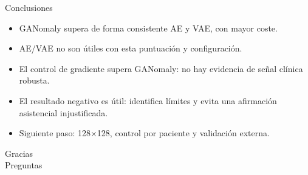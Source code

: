 \documentclass[aspectratio=169,10pt]{beamer}
\begin{document}
\begin{frame}{Conclusiones}
  \begin{itemize}
    \item GANomaly supera de forma consistente AE y VAE, con mayor coste.
    \item AE/VAE no son útiles con esta puntuación y configuración.
    \item El control de gradiente supera GANomaly: no hay evidencia de señal
      clínica robusta.
    \item El resultado negativo es útil: identifica límites y evita una
      afirmación asistencial injustificada.
    \item Siguiente paso: 128$\times$128, control por paciente y validación externa.
  \end{itemize}
\end{frame}

\begin{frame}
  \centering\Huge Gracias\\[1em]
  \Large Preguntas
\end{frame}
\end{document}
